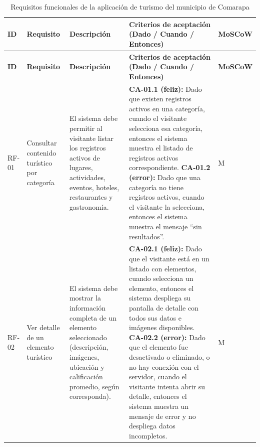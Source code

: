 %

\begingroup
\small
\begin{longtable}{|>{\bfseries}p{1.2cm}|p{2.3cm}|p{3.4cm}|p{5.9cm}|>{\centering\arraybackslash}p{1.1cm}|}
\caption{Requisitos funcionales de la aplicación de turismo del municipio de Comarapa}
\label{tab:rf} \\
\hline
\textbf{ID} & \textbf{Requisito} & \textbf{Descripción} & \textbf{Criterios de aceptación (Dado / Cuando / Entonces)} & \textbf{MoSCoW} \\ \hline
\endfirsthead

\hline
\textbf{ID} & \textbf{Requisito} & \textbf{Descripción} & \textbf{Criterios de aceptación (Dado / Cuando / Entonces)} & \textbf{MoSCoW} \\ \hline
\endhead

\hline
\endfoot

\hline
\endlastfoot

RF-01 & Consultar contenido turístico por categoría & El sistema debe permitir al visitante listar los registros activos de lugares, actividades, eventos, hoteles, restaurantes y gastronomía. &
\textbf{CA-01.1 (feliz):} Dado que existen registros activos en una categoría, cuando el visitante selecciona esa categoría, entonces el sistema muestra el listado de registros activos correspondiente.
\newline
\textbf{CA-01.2 (error):} Dado que una categoría no tiene registros activos, cuando el visitante la selecciona, entonces el sistema muestra el mensaje ``sin resultados''. & M \\ \hline

RF-02 & Ver detalle de un elemento turístico & El sistema debe mostrar la información completa de un elemento seleccionado (descripción, imágenes, ubicación y calificación promedio, según corresponda). &
\textbf{CA-02.1 (feliz):} Dado que el visitante está en un listado con elementos, cuando selecciona un elemento, entonces el sistema despliega su pantalla de detalle con todos sus datos e imágenes disponibles.
\newline
\textbf{CA-02.2 (error):} Dado que el elemento fue desactivado o eliminado, o no hay conexión con el servidor, cuando el visitante intenta abrir su detalle, entonces el sistema muestra un mensaje de error y no despliega datos incompletos. & M \\ \hline


\end{longtable}
